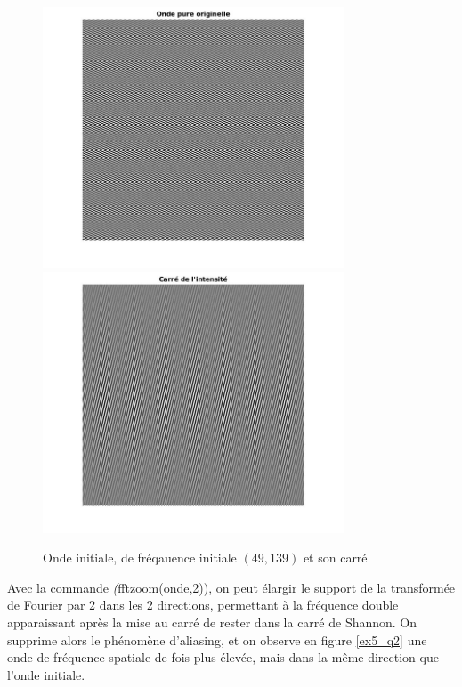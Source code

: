 \documentclass[12pt,a4paper,onecolumn]{article}
\begin{document}
\begin{figure}[H]
\begin{center}
	\includegraphics[width = 0.8\textwidth]{ex5_onde.jpg}
	\includegraphics[width = 0.8\textwidth]{ex5_onde_square.jpg}
\end{center}
\caption{Onde initiale, de fréqauence initiale $(49, 139)$ et son carré}
\label{ex5_q1}
\end{figure}

Avec la commande \textit(fftzoom(onde,2)), on peut élargir le support de la transformée de Fourier par 2 dans les 2 directions, permettant à la fréquence double apparaissant après la mise au carré de rester dans la carré de Shannon. On supprime alors le phénomène d'aliasing, et on observe en figure \ref{ex5_q2} une onde de fréquence spatiale de fois plus élevée, mais dans la même direction que l'onde initiale.
\end{document}
